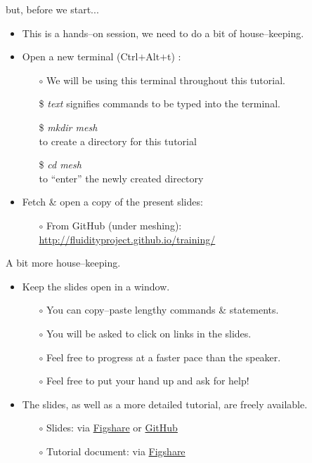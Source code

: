 \documentclass[t]{beamer}
\begin{document}
\begin{frame}{but, before we start...}
  \begin{itemize}
      \item This is a hands--on session, we need to do a bit of house--keeping.
      \vspace{10pt}
      \item Open a new terminal (Ctrl$+$Alt$+$t) :
      \begin{itemize}
         \item[$\circ$] We will be using this terminal throughout this tutorial.
         \item[\$] \emph{text} signifies commands to be typed into the terminal.
         \item[\$] \emph{mkdir mesh} \\to create a directory for this tutorial
         \item[\$] \emph{cd mesh} \\to ``enter'' the newly created directory
      \end{itemize}
      \vspace{10pt}
      \item Fetch \& open a copy of the present slides:
      \begin{itemize}
         \item[$\circ$] From GitHub (under meshing): \url{http://fluidityproject.github.io/training/}
      \end{itemize}
  \end{itemize}
\end{frame}

\begin{frame}{A bit more house--keeping.}
  \begin{itemize}
     \item Keep the slides open in a window.
     \begin{itemize}
         \item[$\circ$] You can copy--paste lengthy commands \& statements.
         \item[$\circ$] You will be asked to click on links in the slides.
         \item[$\circ$] Feel free to progress at a faster pace than the speaker.
         \item[$\circ$] Feel free to put your hand up and ask for help!
     \end{itemize}
     \vspace{10pt}
     \item The slides, as well as a more detailed tutorial, are freely available.\\
     \begin{itemize}
         \item[$\circ$] Slides: via \href{http://figshare.com/s/0dbd16a2635b11e4a71206ec4b8d1f61}{Figshare} or \href{http://fluidityproject.github.io/training/}{GitHub}
         \item[$\circ$] Tutorial document: via \href{}{Figshare}
     \end{itemize}
  \end{itemize}
\end{frame}
\end{document}
